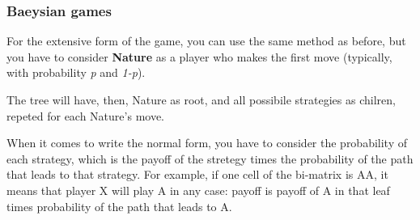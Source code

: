 \subsubsection*{Baeysian games}
For the extensive form of the game, you can use the same method as before, but you have to consider \textbf{Nature} as a player who makes the first move (typically, with probability \textit{p} and \textit{1-p}).

The tree will have, then, Nature as root, and all possibile strategies as chilren, repeted for each Nature's move. 

When it comes to write the normal form, you have to consider the probability of each strategy, which is the payoff of the stretegy times the probability of the path that leads to that strategy. For example, if one cell of the bi-matrix is AA, it means that player X will play A in any case: payoff is payoff of A in that leaf times probability of the path that leads to A.